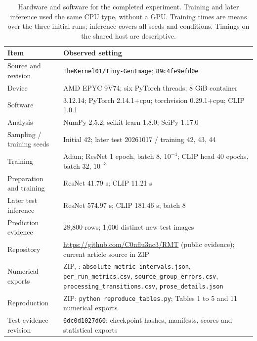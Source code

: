 \begin{table}[!htbp]
\caption{Hardware and software for the completed experiment. Training and later inference used the same CPU type, without a GPU. Training times are means over the three initial runs; inference covers all seeds and conditions. Timings on the shared host are descriptive.}
\label{tab:reproducibility}
\centering
\small
\setlength{\tabcolsep}{3.2pt}\renewcommand{\arraystretch}{1.10}
\begin{tabularx}{\linewidth}{@{}lY@{}}
\toprule
Item & Observed setting\\
\midrule
Source and revision & \texttt{TheKernel01/Tiny-GenImage}; \texttt{89c4fe9efd0e}\\
Device & AMD EPYC 9V74; six PyTorch threads; 8 GiB container\\
Software & 3.12.14; PyTorch 2.14.1+cpu; torchvision 0.29.1+cpu; CLIP 1.0.1\\
Analysis & NumPy 2.5.2; scikit-learn 1.8.0; SciPy 1.17.0\\
Sampling / training seeds & Initial 42; later test 20261017 / training 42, 43, 44\\
Training & Adam; ResNet 1 epoch, batch 8, $10^{-4}$; CLIP head 40 epochs, batch 32, $10^{-3}$\\
Preparation and training & ResNet 41.79 s; CLIP 11.21 s\\
Later test inference & ResNet 574.97 s; CLIP 181.46 s; batch 8\\
Prediction evidence & 28,800 rows; 1,600 distinct new test images\\
Repository & \url{https://github.com/C0nflu3nc3/RMT} (public evidence); current article source in ZIP\\
Numerical exports & ZIP, : \nolinkurl{absolute_metric_intervals.json}, \nolinkurl{per_run_metrics.csv}, \nolinkurl{source_group_errors.csv}, \nolinkurl{processing_transitions.csv}, \nolinkurl{prose_details.json}\\
Reproduction & ZIP: \texttt{python reproduce\_tables.py}; Tables 1 to 5 and 11 numerical exports\\
Test-evidence revision & \texttt{6dc0d1027d60}; checkpoint hashes, manifests, scores and statistical exports\\
\bottomrule
\end{tabularx}
\end{table}
